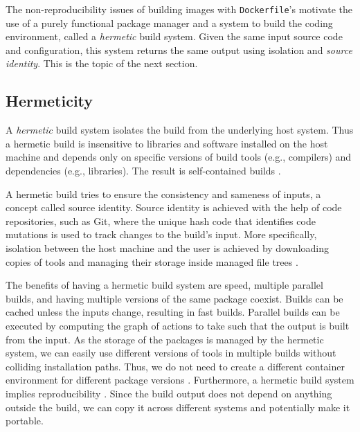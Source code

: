 The non-reproducibility issues of building images with \verb|Dockerfile|'s motivate the use of a purely functional package manager and a system to build the coding environment, called a \emph{hermetic} build system. Given the same input source code and configuration, this system returns the same output using isolation and \emph{source identity}. This is the topic of the next section.

\subsection{Hermeticity}\label{hermeticity}
A \emph{hermetic} build system isolates the build from the underlying host system. Thus a hermetic build is insensitive to libraries and software installed on the host machine and depends only on specific versions of build tools (e.g., compilers) and dependencies (e.g., libraries). The result is self-contained builds \cite{HermeticityBazel}. 

A hermetic build tries to ensure the consistency and sameness of inputs, a concept called source identity. Source identity is achieved with the help of code repositories, such as Git, where the unique hash code that identifies code mutations is used to track changes to the build's input. More specifically, isolation between the host machine and the user is achieved by downloading copies of tools and managing their storage inside managed file trees \cite{HermeticityBazel}. 

The benefits of having a hermetic build system are speed, multiple parallel builds, and having multiple versions of the same package coexist. Builds can be cached unless the inputs change, resulting in fast builds. Parallel builds can be executed by computing the graph of actions to take such that the output is built from the input. As the storage of the packages is managed by the hermetic system, we can easily use different versions of tools in multiple builds without colliding installation paths. Thus, we do not need to create a different container environment for different package versions \cite{HermeticityBazel}\cite{NixPills1}. Furthermore, a hermetic build system implies reproducibility \cite{HermeticityBazel}. Since the build output does not depend on anything outside the build, we can copy it across different systems and potentially make it portable.


